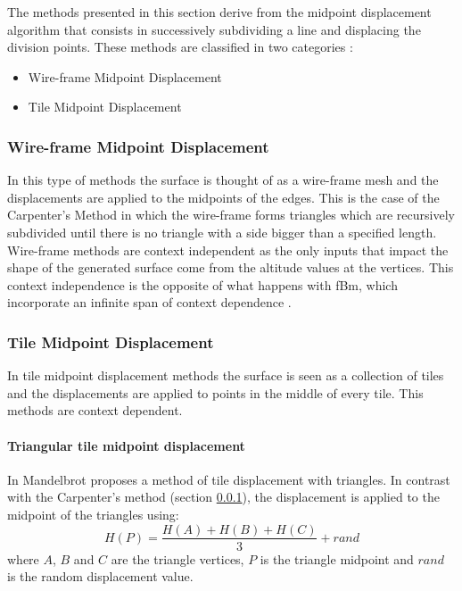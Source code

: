 The methods presented in this section derive from the midpoint displacement algorithm that consists in successively subdividing a line and displacing the division points. These methods are classified in two categories \cite{Mandelbrot1988}:
\begin{itemize}
	\item Wire-frame Midpoint Displacement
	\item Tile Midpoint Displacement
\end{itemize}

\subsubsection{Wire-frame Midpoint Displacement} \label{sect:wireframeMD}

In this type of methods the surface is thought of as a wire-frame mesh and the displacements are applied to the midpoints of the edges. This is the case of the Carpenter's Method \cite{Fournier1982} in which the wire-frame forms triangles which are recursively subdivided until there is no triangle with a side bigger than a specified length. Wire-frame methods are context independent as the only inputs that impact the shape of the generated surface come from the altitude values at the vertices. This context independence is the opposite of what happens with fBm, which incorporate an infinite span of context dependence \cite{Mandelbrot1988}.



\subsubsection{Tile Midpoint Displacement}

In tile midpoint displacement methods the surface is seen as a collection of tiles and the displacements are applied to points in the middle of every tile. This methods are context dependent.

\paragraph{Triangular tile midpoint displacement}
In \cite{Mandelbrot1988} Mandelbrot proposes a method of tile displacement with triangles. In contrast with the Carpenter's method (section \ref{sect:wireframeMD}), the displacement is applied to the midpoint of the triangles using: \[ H(P) = \frac{H(A) + H(B) + H(C)}{3} + rand \] where $A$, $B$ and $C$ are the triangle vertices, $P$ is the triangle midpoint  and $rand$ is the random displacement value.

